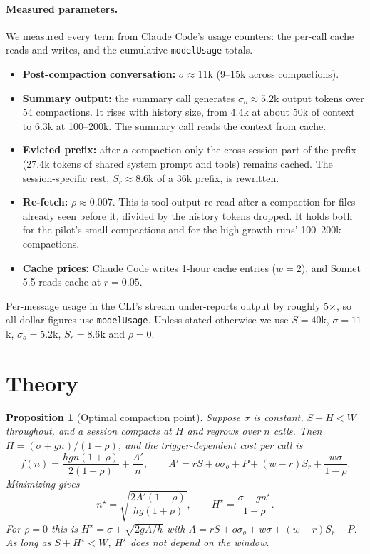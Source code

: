 \documentclass[11pt]{article}
\newtheorem{proposition}{Proposition}
\begin{document}
\paragraph{Measured parameters.} We measured every term from Claude Code's usage counters: the per-call cache reads and writes, and the cumulative \texttt{modelUsage} totals.
\begin{itemize}
\item \textbf{Post-compaction conversation:} $\sigma\approx11$k (9--15k across compactions).
\item \textbf{Summary output:} the summary call generates $\sigma_o\approx5.2$k output tokens over 54 compactions. It rises with history size, from 4.4k at about 50k of context to 6.3k at 100--200k. The summary call reads the context from cache.
\item \textbf{Evicted prefix:} after a compaction only the cross-session part of the prefix (27.4k tokens of shared system prompt and tools) remains cached. The session-specific rest, $S_r\approx8.6$k of a 36k prefix, is rewritten.
\item \textbf{Re-fetch:} $\rho\approx0.007$. This is tool output re-read after a compaction for files already seen before it, divided by the history tokens dropped. It holds both for the pilot's small compactions and for the high-growth runs' 100--200k compactions.
\item \textbf{Cache prices:} Claude Code writes 1-hour cache entries ($w=2$), and Sonnet 5.5 reads cache at $r=0.05$.
\end{itemize}
Per-message usage in the CLI's stream under-reports output by roughly 5$\times$, so all dollar figures use \texttt{modelUsage}. Unless stated otherwise we use $S=40$k, $\sigma=11$k, $\sigma_o=5.2$k, $S_r=8.6$k and $\rho=0$.

\section{Theory}\label{sec:theory}

\begin{proposition}[Optimal compaction point]\label{prop:eoq}
Suppose $\sigma$ is constant, $S+H<W$ throughout, and a session compacts at $H$ and regrows over $n$ calls. Then $H=(\sigma+gn)/(1-\rho)$, and the trigger-dependent cost per call is
\[
f(n)=\frac{hgn(1+\rho)}{2(1-\rho)}+\frac{A'}{n},\qquad A'=rS+o\sigma_o+P+(w-r)S_r+\frac{w\sigma}{1-\rho}.
\]
Minimizing gives
\[
n^\star=\sqrt{\frac{2A'(1-\rho)}{hg(1+\rho)}},\qquad H^\star=\frac{\sigma+gn^\star}{1-\rho}.
\]
For $\rho=0$ this is $H^\star=\sigma+\sqrt{2gA/h}$ with $A=rS+o\sigma_o+w\sigma+(w-r)S_r+P$. As long as $S+H^\star<W$, $H^\star$ does not depend on the window.
\end{proposition}
\end{document}
